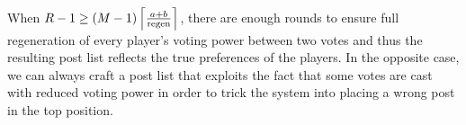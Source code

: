 \begin{proofsketch}
  When $\rounds - 1 \geq \left(\postlen - 1\right)\ceil*{\frac{a +b}{\regen}}$,
  there are enough rounds to ensure full regeneration of every player's voting
  power between two votes and thus the resulting post list reflects the true
  preferences of the players. In the opposite case, we can always craft a post
  list that exploits the fact that some votes are cast with reduced voting power
  in order to trick the system into placing a wrong post in the top position.
\end{proofsketch}
